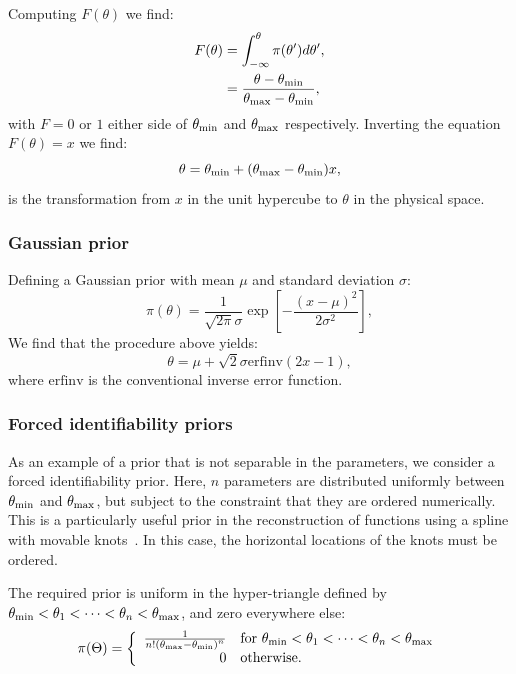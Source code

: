 Computing $F(\theta)$ we find:
\begin{align}
  F(\theta) &= \int_{-\infty}^\theta \pi(\theta')d\theta', \nonumber\\
  &= \frac{\theta-\theta_{\mathrm{min}}}{\theta_{\mathrm{max}}-\theta_{\mathrm{min}}},
  \label{eqn:pc:calc_uniform_trans}
\end{align}
with $F=0$ or $1$ either side of $\theta_{\mathrm{min}}$ and $\theta_{\mathrm{max}}$ respectively. Inverting the equation $F(\theta)=x$ we find:
\begin{equation}
  \theta = \theta_{\mathrm{min}}+(\theta_{\mathrm{max}}-\theta_{\mathrm{min}})x,
  \label{eqn:pc:uniform_trans}                           
\end{equation}
is the transformation from $x$ in the unit hypercube to $\theta$ in the physical space.

\subsubsection{Gaussian prior}
\label{sec:pc:gaussian_prior}
Defining a Gaussian prior with mean $\mu$ and standard deviation $\sigma$:
\begin{equation}
  \pi(\theta) = \frac{1}{\sqrt{2\pi}\sigma}\exp{\left[-\frac{{(x-\mu)}^2}{2\sigma^2}\right]},
  \label{eqn:pc:gaussian_prior}
\end{equation}
We find that the procedure above yields:
\begin{equation}
  \theta = \mu + \sqrt{2}\sigma\text{erfinv}(2x-1),
  \label{eqn:pc:gaussian_trans}                           
\end{equation}
where $\text{erfinv}$ is the conventional inverse error function.




\subsubsection{Forced identifiability priors}
\label{sec:pc:forced_identifiablility}

As an example of a prior that is not separable in the parameters, we consider a forced identifiability prior. Here, $n$ parameters are distributed uniformly between $\theta_{\mathrm{min}}$ and $\theta_{\mathrm{max}}$, but subject to the constraint that they are ordered numerically. This is a particularly useful prior in the reconstruction of functions using a spline with movable knots~\citep{vazquez_knots,knottedsky1,knottedsky2,planck2015-a24}. In this case, the  horizontal locations of the knots must be ordered.

The required prior is uniform in the hyper-triangle defined by $\theta_{\mathrm{min}}<\theta_1<\cdots<\theta_n<\theta_{\mathrm{max}}$, and zero everywhere else:
%
\begin{equation}
  \pi(\Theta) = 
  \left\{
    \begin{array}{rl}
      \frac{1}{n!{(\theta_{\mathrm{max}} - \theta_{\mathrm{min}})}^{n}} 
      &
      \text{for }\theta_{\mathrm{min}}<\theta_1<\cdots<\theta_n<\theta_{\mathrm{max}} \\
      0 &\text{otherwise.}
    \end{array}
    \right.
\label{eqn:pc:sorted_uniform_prior}
\end{equation}


